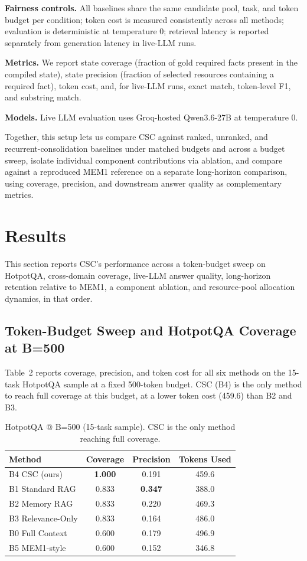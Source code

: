 \documentclass{article}
\begin{document}
\textbf{Fairness controls.} All baselines share the same candidate pool, task, and token budget per condition; token cost is measured consistently across all methods; evaluation is deterministic at temperature 0; retrieval latency is reported separately from generation latency in live-LLM runs.

\textbf{Metrics.} We report state coverage (fraction of gold required facts present in the compiled state), state precision (fraction of selected resources containing a required fact), token cost, and, for live-LLM runs, exact match, token-level F1, and substring match.

\textbf{Models.} Live LLM evaluation uses Groq-hosted Qwen3.6-27B at temperature 0.

Together, this setup lets us compare CSC against ranked, unranked, and recurrent-consolidation baselines under matched budgets and across a budget sweep, isolate individual component contributions via ablation, and compare against a reproduced MEM1 reference on a separate long-horizon comparison, using coverage, precision, and downstream answer quality as complementary metrics.

\section{Results}

This section reports CSC's performance across a token-budget sweep on HotpotQA, cross-domain coverage, live-LLM answer quality, long-horizon retention relative to MEM1, a component ablation, and resource-pool allocation dynamics, in that order.

\subsection{Token-Budget Sweep and HotpotQA Coverage at B=500}

Table~2 reports coverage, precision, and token cost for all six methods on the 15-task HotpotQA sample at a fixed 500-token budget. CSC (B4) is the only method to reach full coverage at this budget, at a lower token cost (459.6) than B2 and B3.

\begin{table}[t]
\caption{HotpotQA @ B=500 (15-task sample). CSC is the only method reaching full coverage.}
\centering
\begin{tabular}{lccc}
\toprule
Method & Coverage & Precision & Tokens Used \\
\midrule
B4 CSC (ours) & \textbf{1.000} & 0.191 & 459.6 \\
B1 Standard RAG & 0.833 & \textbf{0.347} & 388.0 \\
B2 Memory RAG & 0.833 & 0.220 & 469.3 \\
B3 Relevance-Only & 0.833 & 0.164 & 486.0 \\
B0 Full Context & 0.600 & 0.179 & 496.9 \\
B5 MEM1-style & 0.600 & 0.152 & 346.8 \\
\bottomrule
\end{tabular}
\end{table}
\end{document}
